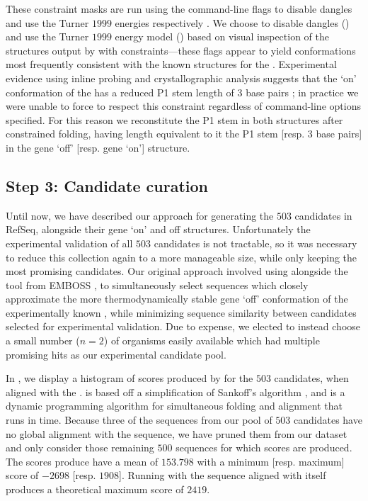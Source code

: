 These constraint masks are run using the command-line flags
 to disable dangles and use the Turner $1999$
energies respectively \citep{mathews:1999jw}. We choose to disable dangles () and use
the Turner $1999$ energy model ()
based on visual inspection of the structures output by \rfold with
constraints---these flags appear to yield conformations most frequently consistent
with the known structures for the \Bsxpt \grb.
Experimental evidence using inline probing and
crystallographic analysis suggests that
the `on' conformation of the \grb has a reduced P1 stem length of 3 base pairs
\citep{mandalboesebarrickwinklerbreaker,serganov:2004dq};
in practice we were unable to force \rfold to respect this constraint regardless
of command-line options specified. For this reason we reconstitute the P1 stem in
both structures after constrained folding, having length equivalent to it the
\infernal P1 stem [resp. 3 base pairs] in the gene `off' [resp. gene `on']
structure.

\subsection{Step 3: Candidate curation}
\label{subsec:rfinder:curation}

Until now, we have described our approach for generating the $503$ \grb candidates
in RefSeq, alongside their gene `on' and off structures. Unfortunately the
experimental validation of all $503$ candidates is not tractable, so it was
necessary to reduce this collection again to a more manageable size, while only
keeping the most promising candidates. Our original approach involved using
\foldalign \citep{gorodkin:1997tr,havgaard:2007ca} alongside the  tool from EMBOSS
\citep{rice:2000wr}, to simultaneously
select sequences which closely approximate the more thermodynamically stable
gene `off' conformation of the experimentally known \Bsxpt \grb, while minimizing
sequence similarity between candidates selected for experimental validation. Due to
expense, we elected to instead choose a small number
($n = 2$) of organisms easily available which had multiple promising hits as our
experimental candidate pool.

In , we display a histogram of scores produced
by \foldalign for the $503$ candidates, when aligned with the \Bsxpt \grb. \foldalign
is based off a simplification of Sankoff's algorithm \citep{sankoff:1985wc}, and
is a dynamic programming
algorithm for simultaneous folding and alignment that runs in  time. Because three of the sequences from our pool of $503$ candidates have
no global alignment with the \Bsxpt sequence, we have pruned them from our
dataset and only consider those remaining $500$ sequences for which \foldalign
scores are produced. The \foldalign scores produce have a mean of $153.798$ with a
minimum [resp. maximum] score of $-2698$ [resp. $1908$]. Running \foldalign with the
\Bsxpt sequence aligned with itself produces a theoretical maximum score of $2419$.

